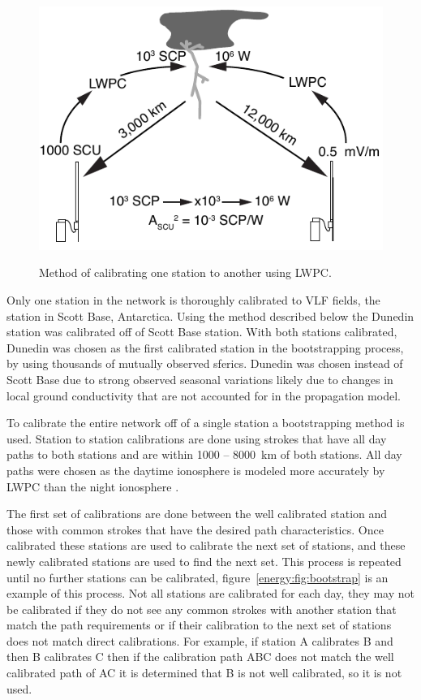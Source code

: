 \begin{figure}[ht!]
\centering
\includegraphics[scale=1]{energy/Figures/PPS_Method.pdf}\\
\caption{Method of calibrating one station to another using LWPC.}
\label{energy:fig:calibrate}
\end{figure}

Only one station in the network is thoroughly calibrated to VLF fields, the station in Scott Base, Antarctica.
Using the method described below the Dunedin station was calibrated off of Scott Base station.
With both stations calibrated, Dunedin was chosen as the first calibrated station in the bootstrapping process, by using thousands of mutually observed sferics.
Dunedin was chosen instead of Scott Base due to strong observed seasonal variations likely due to changes in local ground conductivity that are not accounted for in the propagation model.

To calibrate the entire network off of a single station a bootstrapping method is used.
Station to station calibrations are done using strokes that have all day paths to both stations and are within 1000 -- 8000~km of both stations.
All day paths were chosen as the daytime ionosphere is modeled more accurately by LWPC than the night ionosphere \citep{McRae2000d}.

The first set of calibrations are done between the well calibrated station and those with common strokes that have the desired path characteristics.
Once calibrated these stations are used to calibrate the next set of stations, and these newly calibrated stations are used to find the next set.
This process is repeated until no further stations can be calibrated, figure~\ref{energy:fig:bootstrap} is an example of this process.
Not all stations are calibrated for each day, they may not be calibrated if they do not see any common strokes with another station that match the path requirements or if their calibration to the next set of stations does not match direct calibrations.
For example, if station A calibrates B and then B calibrates C then if the calibration path ABC does not match the well calibrated path of AC it is determined that B is not well calibrated, so it is not used.

